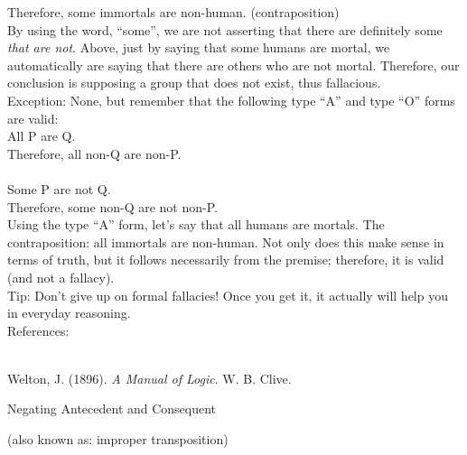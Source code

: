 \documentclass[a4paper,12pt,single,pdftex]{scrbook}
\begin{document}
    
      Therefore, some immortals are non-human. (contraposition)
    \\

    
      By using the word, “some”, we are not asserting that there are definitely some {\it that are not}.  Above, just by saying that some humans are mortal, we automatically are saying that there are others who are not mortal.  Therefore, our conclusion is supposing a group that does not exist, thus fallacious.
    \\

    
      Exception: None, but remember that the following type “A” and type “O” forms are valid:
    \\

    
      All P are Q.
    \\

    
      Therefore, all non-Q are non-P.
    \\

    
       
    \\

    
      Some P are not Q.
    \\

    
      Therefore, some non-Q are not non-P.
    \\

    
      Using the type “A” form, let’s say that all humans are mortals.  The contraposition: all immortals are non-human.  Not only does this make sense in terms of truth, but it follows necessarily from the premise; therefore, it is valid (and not a fallacy).
    \\

    
      Tip: Don’t give up on formal fallacies!  Once you get it, it actually will help you in everyday reasoning.
    \\

    References:

    
      
        
      \\

      
        
          Welton, J. (1896). {\it A Manual of Logic}. W. B. Clive.
        
      
    
  

Negating Antecedent and Consequent
    
      (also known as: improper transposition)
    \\
\end{document}
